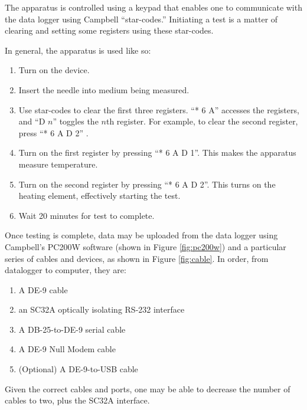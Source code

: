 The apparatus is controlled using a keypad that enables one to communicate
with the data logger using Campbell ``star-codes.'' Initiating a test is a
matter of clearing and setting some registers using these star-codes.

In general, the apparatus is used like so:

\begin{enumerate}
\item Turn on the device.
\item Insert the needle into medium being measured.
\item Use star-codes to clear the first three registers. ``* 6 A'' accesses the
registers, and ``D \(n\)'' toggles the \(n\)th register. For example, to clear
the second register, press ``* 6 A D 2'' .
\item Turn on the first register by pressing ``* 6 A D 1''. This makes the
apparatus measure temperature.
\item Turn on the second register by pressing ``* 6 A D 2''. This turns on the
heating element, effectively starting the test.
\item Wait 20 minutes for test to complete.
\end{enumerate}

Once testing is complete, data may be uploaded from the data logger using
Campbell's PC200W software (shown in Figure \ref{fig:pc200w}) and a particular series of cables and devices, as
shown in Figure \ref{fig:cable}. In order, from datalogger to computer, they
are:


\begin{enumerate}
\item A DE-9 cable
\item an SC32A optically isolating RS-232 interface
\item A DB-25-to-DE-9 serial cable
\item A DE-9 Null Modem cable
\item (Optional) A DE-9-to-USB cable
\end{enumerate}

Given the correct cables and ports, one may be able to decrease the number of
cables to two, plus the SC32A interface.

